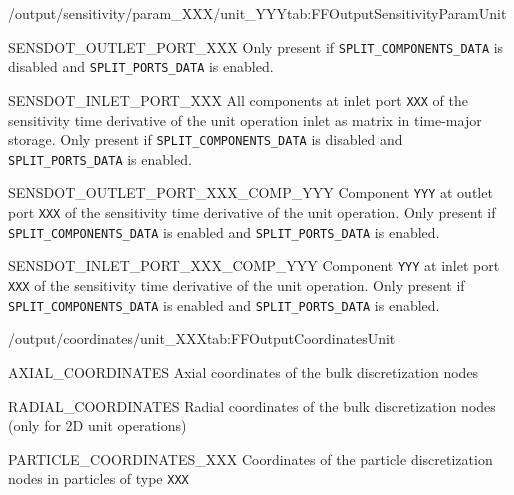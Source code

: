 \begin{groupscope}{/output/sensitivity/param\_XXX/unit\_YYY}{tab:FFOutputSensitivityParamUnit}
\begin{dataset}[type=double,unit={\si{\mol\per\cubic\metre\of{IV}\per\second\per\ParamUnit}}]{SENSDOT\_OUTLET\_PORT\_XXX}
    Only present if \texttt{SPLIT\_COMPONENTS\_DATA} is disabled and \texttt{SPLIT\_PORTS\_DATA} is enabled.
  \end{dataset}
  \begin{dataset}[type=double,unit={\si{\mol\per\cubic\metre\of{IV}\per\second\per\ParamUnit}}]{SENSDOT\_INLET\_PORT\_XXX}
    All components at inlet port \texttt{XXX} of the sensitivity time derivative of the unit operation inlet as matrix in time-major storage.
    Only present if \texttt{SPLIT\_COMPONENTS\_DATA} is disabled and \texttt{SPLIT\_PORTS\_DATA} is enabled.
  \end{dataset}
  \begin{dataset}[type=double,unit={\si{\mol\per\cubic\metre\of{IV}\per\second\per\ParamUnit}}]{SENSDOT\_OUTLET\_PORT\_XXX\_COMP\_YYY}
    Component \texttt{YYY} at outlet port \texttt{XXX} of the sensitivity time derivative of the unit operation.
    Only present if \texttt{SPLIT\_COMPONENTS\_DATA} is enabled and \texttt{SPLIT\_PORTS\_DATA} is enabled.
  \end{dataset}
  \begin{dataset}[type=double,unit={\si{\mol\per\cubic\metre\of{IV}\per\second\per\ParamUnit}}]{SENSDOT\_INLET\_PORT\_XXX\_COMP\_YYY}
    Component \texttt{YYY} at inlet port \texttt{XXX} of the sensitivity time derivative of the unit operation.
    Only present if \texttt{SPLIT\_COMPONENTS\_DATA} is enabled and \texttt{SPLIT\_PORTS\_DATA} is enabled.
  \end{dataset}
\end{groupscope}

\begin{groupscope}{/output/coordinates/unit\_XXX}{tab:FFOutputCoordinatesUnit}
  \begin{dataset}[type=double,unit={\si{\metre}},length=\texttt{NCOL}]{AXIAL\_COORDINATES}
    Axial coordinates of the bulk discretization nodes
  \end{dataset}
  \begin{dataset}[type=double,unit={\si{\metre}},length=\texttt{NRAD}]{RADIAL\_COORDINATES}
    Radial coordinates of the bulk discretization nodes (only for 2D unit operations)
  \end{dataset}
  \begin{dataset}[type=double,unit={\si{\metre}},length=\texttt{NPAR}]{PARTICLE\_COORDINATES\_XXX}
    Coordinates of the particle discretization nodes in particles of type \texttt{XXX}
  \end{dataset}
\end{groupscope}

